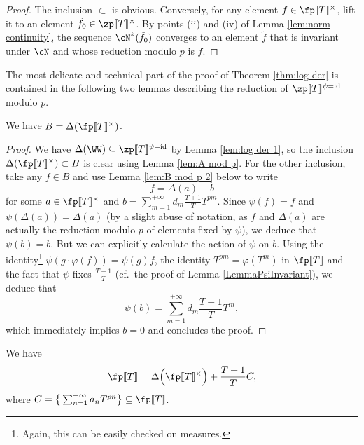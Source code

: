 \documentclass[a4paper,10pt, english, reqno]{smfart}
\newcommand{\lsem}{[\! [}
\newcommand{\rsem}{]\! ]}
\numberwithin{equation}{section}
\begin{document}
\begin{proof}
	The inclusion $\subset$ is obvious. Conversely, for any element $f \in \fp\lsem T\rsem ^\times$, lift it to an element $\tilde{f}_0 \in \zp\lsem T\rsem ^\times$. By points (ii) and (iv) of Lemma \ref{lem:norm continuity}, the sequence $\cN^k(\tilde{f}_0)$ converges to an element $\tilde{f}$ that is invariant under $\cN$ and whose reduction modulo $p$ is $f$. 
\end{proof}

The most delicate and technical part of the proof of Theorem \ref{thm:log der} is contained in the following two lemmas describing the reduction of $\zp\lsem T\rsem ^{\psi=\mathrm{id}}$ modulo $p$.

\begin{lemma} \label{lem:B mod p}
	We have $B = \Delta(\fp\lsem T\rsem ^\times)$.
\end{lemma}

\begin{proof}
	We have $\Delta(\WW) \subseteq \zp\lsem T\rsem ^{\psi=\mathrm{id}}$ by Lemma \ref{lem:log der 1}, so the inclusion $\Delta(\fp\lsem T\rsem ^\times) \subset B$ is clear using Lemma \ref{lem:A mod p}. For the other inclusion, take any $f \in B$ and use Lemma \ref{lem:B mod p 2} below to write
	\[ f = \Delta(a) + b \] 
	for some $a \in \fp\lsem T\rsem ^\times$ and $b = \sum_{m = 1}^{+\infty} d_m \frac{T + 1}{T} T^{pm}$. Since $\psi(f) = f$ and $\psi(\Delta(a)) = \Delta(a)$ (by a slight abuse of notation, as $f$ and $\Delta(a)$ are actually the reduction modulo $p$ of elements fixed by $\psi$), we deduce that $\psi(b) = b$. But we can explicitly calculate the action of $\psi$ on $b$. Using the identity\footnote{Again, this can be easily checked on measures.} $\psi(g\cdot\varphi(f)) = \psi(g) f$, the identity $T^{pm} = \varphi(T^m)$ in $\fp\lsem T\rsem $ and the fact that $\psi$ fixes $\frac{T + 1}{T}$ (cf.\ the proof of Lemma \ref{LemmaPsiInvariant}), we deduce that 
	\[ \psi(b) = \sum_{m = 1}^{+\infty} d_m \frac{T + 1}{T} T^m, \]
	which immediately implies $b = 0$ and concludes the proof.
\end{proof}

\begin{lemma} \label{lem:B mod p 2}
	We have
	\[ \fp\lsem T\rsem  = \Delta\Big(\fp\lsem T\rsem ^\times\Big) + \frac{T + 1}{T} C, \] 
	where $C = \big\{ \sum_{n = 1}^{+ \infty} a_n T^{pn} \big\} \subseteq \fp\lsem T\rsem $.
\end{lemma}
\end{document}
